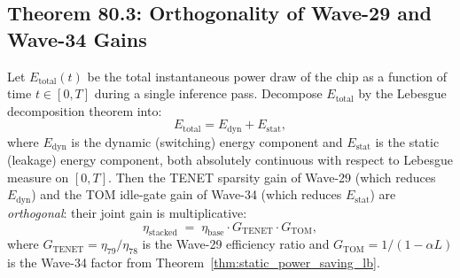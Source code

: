 \subsection{Theorem 80.3: Orthogonality of Wave-29 and Wave-34 Gains}

\begin{theorem}
\label{thm:orthogonality}
Let \(E_{\mathrm{total}}(t)\) be the total instantaneous power draw of
the chip as a function of time \(t \in [0, T]\) during a single
inference pass.  Decompose \(E_{\mathrm{total}}\) by the Lebesgue
decomposition theorem into:
\[
  E_{\mathrm{total}} = E_{\mathrm{dyn}} + E_{\mathrm{stat}},
\]
where \(E_{\mathrm{dyn}}\) is the dynamic (switching) energy component
and \(E_{\mathrm{stat}}\) is the static (leakage) energy component,
both absolutely continuous with respect to Lebesgue measure on \([0,T]\).
Then the TENET sparsity gain of Wave-29 (which reduces \(E_{\mathrm{dyn}}\))
and the TOM idle-gate gain of Wave-34 (which reduces \(E_{\mathrm{stat}}\))
are \emph{orthogonal}: their joint gain is multiplicative:
\[
  \eta_{\mathrm{stacked}} \;=\; \eta_{\mathrm{base}} \cdot G_{\mathrm{TENET}} \cdot G_{\mathrm{TOM}},
\]
where \(G_{\mathrm{TENET}} = \eta_{79}/\eta_{78}\) is the Wave-29 efficiency
ratio and \(G_{\mathrm{TOM}} = 1/(1 - \alpha L)\) is the Wave-34 factor from
Theorem~\ref{thm:static_power_saving_lb}.
\end{theorem}

